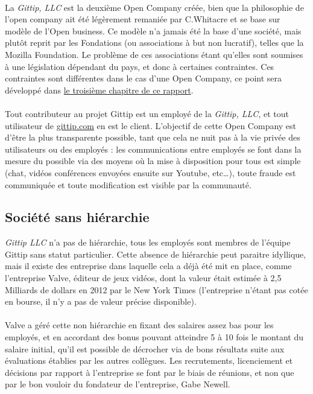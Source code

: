 \paragraph{}
La \emph{Gittip, LLC} est la deuxième Open Company créée, bien que la
philosophie de l'open company ait été légèrement remaniée par C.Whitacre et se
base sur modèle de l'Open business. Ce modèle n'a jamais été la base d'une
société, mais plutôt reprit par les Fondations (ou associations à but non
lucratif), telles que la Mozilla Foundation. Le problème de ces associations
étant qu'elles sont soumises à une législation dépendant du pays, et donc à
certaines contraintes. Ces contraintes sont différentes dans le cas d'une Open
Company, ce point sera développé dans \hyperref[chapter3]{le troisième chapitre
de ce rapport}.

\paragraph{}
Tout contributeur au projet Gittip est un employé de la \emph{Gittip, LLC}, et
tout utilisateur de \url{gittip.com} en est le client. L'objectif de cette Open
Company est d'être la plus transparente possible, tant que cela ne nuit pas à
la vie privée des utilisateurs ou des employés : les communications entre
employés se font dans la mesure du possible via des moyens où la mise à
disposition pour tous est simple (chat, vidéos conférences envoyées ensuite sur
Youtube, etc\ldots), toute fraude est communiquée et toute modification est
visible par la communauté.

    \subsection{Société sans hiérarchie}

\emph{Gittip LLC} n'a pas de hiérarchie, tous les employés sont membres de
l'équipe Gittip sans statut particulier. Cette absence de hiérarchie peut
paraitre idyllique, mais il existe des entreprise dans laquelle cela a déjà été
mit en place, comme l'entreprise Valve, éditeur de jeux vidéos, dont la valeur
était estimée à 2,5 Milliards de dollars en 2012 par le New York Times
(l'entreprise n'étant pas cotée en bourse, il n'y a pas de valeur précise
disponible).

\paragraph{}
Valve a géré cette non hiérarchie en fixant des salaires assez bas pour les
employés, et en accordant des bonus pouvant atteindre 5 à 10 fois le montant du
salaire initial, qu'il est possible de décrocher via de bons résultats suite
aux évaluations établies par les autres collègues. Les recrutements,
licenciement et décisions par rapport à l'entreprise se font par le biais de
réunions, et non que par le bon vouloir du fondateur de l'entreprise, Gabe
Newell.

